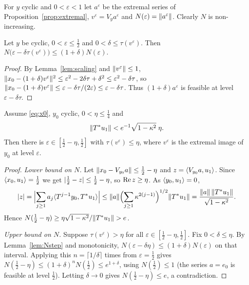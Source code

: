 For $y$ cyclic and $0<\varepsilon<1$ let $a^\varepsilon$ be the extremal series of
Proposition~\ref{prop:extremal}, $v^\varepsilon=V_ya^\varepsilon$ and
$N(\varepsilon)=\lVert a^\varepsilon\rVert$. Clearly $N$ is non-increasing.

\begin{lemma}[\paper{} (10)]\label{lem:Nstep}\stproved{}
Let $y$ be cyclic, $0<\varepsilon\le\frac12$ and $0<\delta\le\tau(v^\varepsilon)$. Then
$N\bigl(\varepsilon-\delta\tau(v^\varepsilon)\bigr)\le(1+\delta)N(\varepsilon)$.
\end{lemma}
\begin{proof}
By Lemma~\ref{lem:scaling} and $\lVert v^\varepsilon\rVert\le1$,
$\lVert x_0-(1+\delta)v^\varepsilon\rVert^2\le\varepsilon^2-2\delta\tau+\delta^2\le\varepsilon^2-\delta\tau$,
so $\lVert x_0-(1+\delta)v^\varepsilon\rVert\le\varepsilon-\delta\tau/(2\varepsilon)\le\varepsilon-\delta\tau$.
Thus $(1+\delta)a^\varepsilon$ is feasible at level $\varepsilon-\delta\tau$.
\end{proof}

\begin{lemma}\label{lem:start}\stproved{}
Assume \eqref{eq:x0}, $y_0$ cyclic, $0<\eta\le\frac14$ and
\[
\lVert T^*u_1\rVert<e^{-1}\sqrt{1-\kappa^2}\;\eta .
\]
Then there is $\varepsilon\in[\frac12-\eta,\frac12]$ with $\tau(v^\varepsilon)\le\eta$, where
$v^\varepsilon$ is the extremal image of $y_0$ at level $\varepsilon$.
\end{lemma}
\begin{proof}
\emph{Lower bound on $N$.} Let $\lVert x_0-V_{y_0}a\rVert\le\frac12-\eta$ and
$z=\langle V_{y_0}a,u_1\rangle$. Since $\langle x_0,u_1\rangle=\frac12$ we get $\lvert \frac12-z\rvert\le\frac12-\eta$,
so $\operatorname{Re} z\ge\eta$. As $\langle y_0,u_1\rangle=0$,
\[
\lvert z\rvert=\Bigl|\sum_{j\ge1}a_j\langle T^{j-1}y_0,T^*u_1\rangle\Bigr|
\le\lVert a\rVert\Bigl(\sum_{j\ge1}\kappa^{2(j-1)}\Bigr)^{1/2}\lVert T^*u_1\rVert
=\frac{\lVert a\rVert\,\lVert T^*u_1\rVert}{\sqrt{1-\kappa^2}} .
\]
Hence $N(\frac12-\eta)\ge\eta\sqrt{1-\kappa^2}/\lVert T^*u_1\rVert>e$.

\emph{Upper bound on $N$.} Suppose $\tau(v^\varepsilon)>\eta$ for all
$\varepsilon\in[\frac12-\eta,\frac12]$. Fix $0<\delta\le\eta$. By Lemma~\ref{lem:Nstep} and
monotonicity, $N(\varepsilon-\delta\eta)\le(1+\delta)N(\varepsilon)$ on that interval. Applying
this $n=\lceil1/\delta\rceil$ times from $\varepsilon=\frac12$ gives
$N(\frac12-\eta)\le(1+\delta)^nN(\frac12)\le e^{1+\delta}$, using $N(\frac12)\le1$ (the series
$a=e_0$ is feasible at level $\frac12$). Letting $\delta\to0$ gives $N(\frac12-\eta)\le e$, a
contradiction.
\end{proof}

